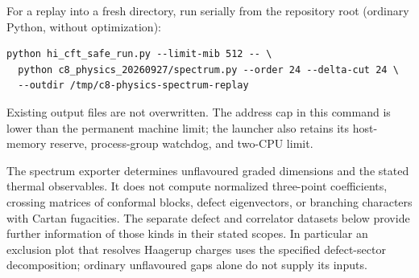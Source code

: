 For a replay into a fresh directory, run serially from the repository
root (ordinary Python, without optimization):
\begin{verbatim}
python hi_cft_safe_run.py --limit-mib 512 -- \
  python c8_physics_20260927/spectrum.py --order 24 --delta-cut 24 \
  --outdir /tmp/c8-physics-spectrum-replay
\end{verbatim}
Existing output files are not overwritten. The address cap in this
command is lower than the permanent machine limit; the launcher also
retains its host-memory reserve, process-group watchdog, and two-CPU
limit.

The spectrum exporter determines unflavoured graded dimensions and
the stated thermal observables.  It does not compute normalized
three-point coefficients, crossing matrices of conformal blocks,
defect eigenvectors, or branching characters with Cartan fugacities.
The separate defect and correlator datasets below provide further
information of those kinds in their stated scopes.  In particular an
exclusion plot that resolves Haagerup charges uses the specified
defect-sector decomposition; ordinary unflavoured gaps alone do not
supply its inputs.
